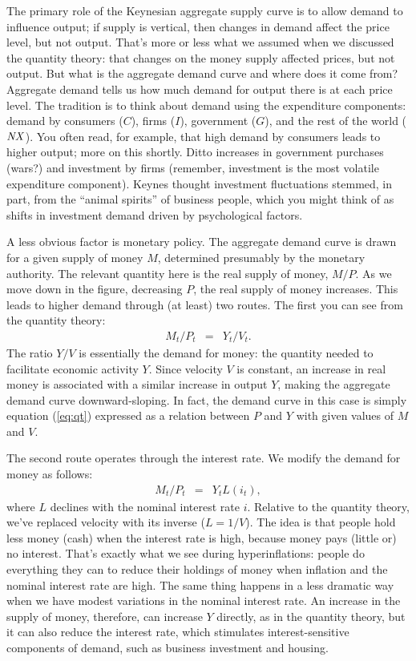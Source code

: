 \documentclass[letterpaper,12pt]{article}
\newcommand{\NX}{\mbox{\em NX\/}}
\begin{document}
The primary role of the Keynesian aggregate supply curve is to 
allow demand to influence output; 
if supply is vertical, then changes in demand affect the price level, 
but not output.
That's more or less what we assumed when we discussed the quantity theory:
that changes on the money supply affected prices, but not output.  
But what is the aggregate demand curve and where does it come from?
Aggregate demand tells us how much demand for output there is at each price level.
The tradition is to think about demand using the expenditure components:  demand by consumers ($C$), firms ($I$), government ($G$), 
and the rest of the world ($\NX$).  
You often read, for example, that high demand by consumers 
leads to higher output; more on this shortly.  
Ditto increases in government purchases (wars?) 
and investment by firms (remember, investment is the most volatile 
expenditure component).  
Keynes thought investment fluctuations stemmed, 
in part, from the ``animal spirits'' of business people, 
which you might think of as shifts in investment demand
driven by psychological factors.  

A less obvious factor is monetary policy.  
The aggregate demand curve is drawn for a given supply of money $M$,
determined presumably by the monetary authority.  
The relevant quantity here is the real supply of money, $M/P$.
As we move down in the figure, decreasing $P$, 
the real supply of money increases.  
This leads to higher demand through (at least) two routes.
The first you can see from the quantity theory:
\begin{eqnarray}
    M_t/P_t  &=& Y_t/V_t .
    \label{eq:qt}
\end{eqnarray}
The ratio $Y/V$ is essentially the demand for money:
the quantity needed to facilitate economic activity $Y$.  
Since velocity $V$ is constant, an increase in real money 
is associated with a similar increase in output $Y$, 
making the aggregate demand curve downward-sloping.  
In fact, the demand curve in this case is simply equation (\ref{eq:qt})
expressed as a relation between $P$ and $Y$ with given values 
of $M$ and $V$.

The second route operates through the interest rate.
We modify the demand for money as follows:  
\begin{eqnarray}
    M_t/P_t  &=&  Y_t L(i_t),
    \label{eq:md}
\end{eqnarray}
where $L$ declines with the nominal interest rate $i$.
Relative to the quantity theory, 
we've replaced velocity with its inverse ($L = 1/V$).
The idea is that people hold less money (cash) when 
the interest rate is high, because money pays (little or) no interest.
That's exactly what we see during hyperinflations: 
people do everything they can to reduce their holdings of money
when inflation and the nominal interest rate are high.
The same thing happens in a less dramatic way when we have 
modest variations in the nominal interest rate.
An increase in the supply of money, therefore, 
can increase $Y$ directly, as in the quantity theory, 
but it can also reduce the interest rate, 
which stimulates interest-sensitive components of demand, 
such as business investment and housing.  
\end{document}
